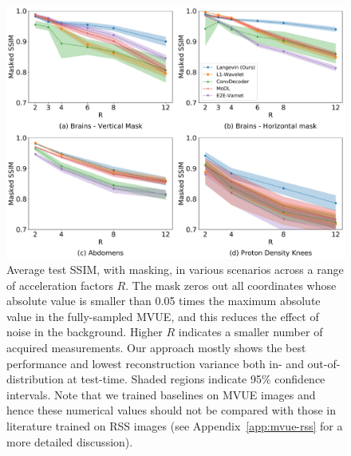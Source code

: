 \documentclass{article}
\begin{document}
\begin{figure}
    \centering
    \includegraphics[width=\columnwidth]{main-masked-ssim-comp.pdf}
    \caption{\small Average test SSIM, with masking, in various scenarios across a range of acceleration factors $R$. The mask zeros out all coordinates whose absolute value is smaller than 0.05 times the maximum absolute value in the fully-sampled MVUE, and this reduces the effect of noise in the background. Higher $R$ indicates a smaller number of acquired measurements. Our approach mostly shows the best performance and lowest reconstruction variance both in- and out-of-distribution at test-time. Shaded regions indicate 95\% confidence intervals. Note that we trained baselines on MVUE images and hence these numerical values should not be compared with those in literature trained on RSS images (see Appendix~\ref{app:mvue-rss} for a more detailed discussion).}
    \label{fig:main-masked-ssim}
\end{figure}
\end{document}
